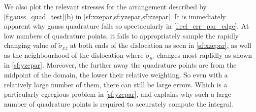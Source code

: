 \documentclass[11pt]{iopart}
\begin{document}
We also plot the relevant stresses for the arrangement described by \cref{f:gauss_quad_test}(b) in \cref{sf:xzepar,sf:yzepar,sf:zzepar}. It is immediately apparent why gauss quadrature fails so spectacularly in \cref{f:rel_err_par_edge}. At low numbers of quadrature points, it fails to appropriately sample the rapidly changing value of $\tilde{\sigma}_{xz}$ at both ends of the dislocation as seen in \cref{sf:xzepar}, as well as the neighbourhood of the dislocation where $\tilde{\sigma}_{yz}$ changes most raplidly as shown in \cref{sf:yzepar}. Moreover, the further away the quadrature points are from the midpoint of the domain, the lower their relative weighting. So even with a relatively large number of them, there can still be large errors. Which is a particularly egregious problem in \cref{sf:yzepar}, and explains why such a large number of quadrature points is required to accurately compute the integral.
\end{document}
